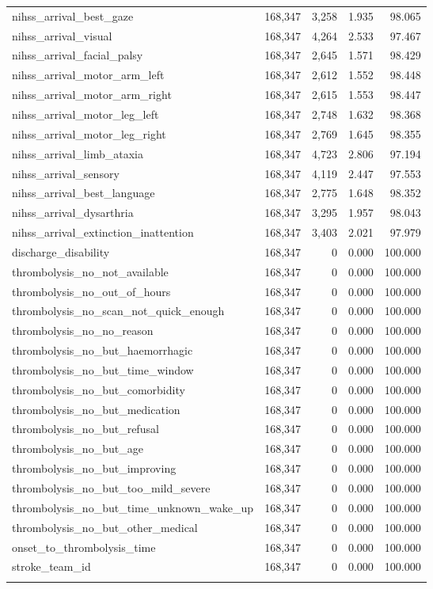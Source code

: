 \begin{longtable}{lrrrr}
nihss\_arrival\_best\_gaze & 168,347 & 3,258 & 1.935 & 98.065 \\
nihss\_arrival\_visual & 168,347 & 4,264 & 2.533 & 97.467 \\
nihss\_arrival\_facial\_palsy & 168,347 & 2,645 & 1.571 & 98.429 \\
nihss\_arrival\_motor\_arm\_left & 168,347 & 2,612 & 1.552 & 98.448 \\
nihss\_arrival\_motor\_arm\_right & 168,347 & 2,615 & 1.553 & 98.447 \\
nihss\_arrival\_motor\_leg\_left & 168,347 & 2,748 & 1.632 & 98.368 \\
nihss\_arrival\_motor\_leg\_right & 168,347 & 2,769 & 1.645 & 98.355 \\
nihss\_arrival\_limb\_ataxia & 168,347 & 4,723 & 2.806 & 97.194 \\
nihss\_arrival\_sensory & 168,347 & 4,119 & 2.447 & 97.553 \\
nihss\_arrival\_best\_language & 168,347 & 2,775 & 1.648 & 98.352 \\
nihss\_arrival\_dysarthria & 168,347 & 3,295 & 1.957 & 98.043 \\
nihss\_arrival\_extinction\_inattention & 168,347 & 3,403 & 2.021 & 97.979 \\
discharge\_disability & 168,347 & 0 & 0.000 & 100.000 \\
thrombolysis\_no\_not\_available & 168,347 & 0 & 0.000 & 100.000 \\
thrombolysis\_no\_out\_of\_hours & 168,347 & 0 & 0.000 & 100.000 \\
thrombolysis\_no\_scan\_not\_quick\_enough & 168,347 & 0 & 0.000 & 100.000 \\
thrombolysis\_no\_no\_reason & 168,347 & 0 & 0.000 & 100.000 \\
thrombolysis\_no\_but\_haemorrhagic & 168,347 & 0 & 0.000 & 100.000 \\
thrombolysis\_no\_but\_time\_window & 168,347 & 0 & 0.000 & 100.000 \\
thrombolysis\_no\_but\_comorbidity & 168,347 & 0 & 0.000 & 100.000 \\
thrombolysis\_no\_but\_medication & 168,347 & 0 & 0.000 & 100.000 \\
thrombolysis\_no\_but\_refusal & 168,347 & 0 & 0.000 & 100.000 \\
thrombolysis\_no\_but\_age & 168,347 & 0 & 0.000 & 100.000 \\
thrombolysis\_no\_but\_improving & 168,347 & 0 & 0.000 & 100.000 \\
thrombolysis\_no\_but\_too\_mild\_severe & 168,347 & 0 & 0.000 & 100.000 \\
thrombolysis\_no\_but\_time\_unknown\_wake\_up & 168,347 & 0 & 0.000 & 100.000 \\
thrombolysis\_no\_but\_other\_medical & 168,347 & 0 & 0.000 & 100.000 \\
onset\_to\_thrombolysis\_time & 168,347 & 0 & 0.000 & 100.000 \\
stroke\_team\_id & 168,347 & 0 & 0.000 & 100.000 \\
\label{tab:missing_all}
\end{longtable}



